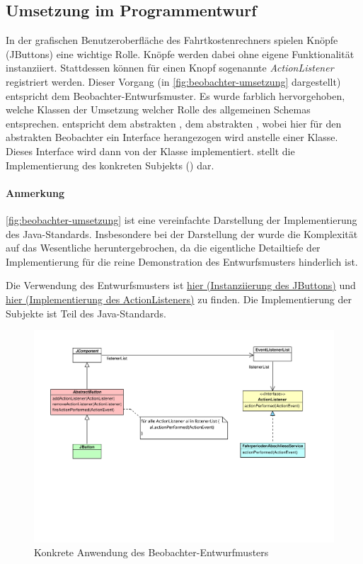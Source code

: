 \subsection{Umsetzung im Programmentwurf}
In der grafischen Benutzeroberfläche des Fahrtkostenrechners spielen Knöpfe (JButtons) eine wichtige Rolle.
Knöpfe werden dabei ohne eigene Funktionalität instanziiert.
Stattdessen können für einen Knopf sogenannte \emph{ActionListener} registriert werden.
Dieser Vorgang (in \autoref{fig:beobachter-umsetzung} dargestellt) entspricht dem Beobachter-Entwurfsmuster.
Es wurde farblich hervorgehoben, welche Klassen der Umsetzung welcher Rolle des allgemeinen Schemas entsprechen.
 entspricht dem abstrakten ,  dem abstrakten , wobei hier für den abstrakten Beobachter ein Interface herangezogen wird anstelle einer Klasse.
Dieses Interface wird dann von der Klasse  implementiert.
 stellt die Implementierung des konkreten Subjekts () dar.

\paragraph{Anmerkung}
\autoref{fig:beobachter-umsetzung} ist eine vereinfachte Darstellung der Implementierung des Java-Standards.
Insbesondere bei der Darstellung der  wurde die Komplexität auf das Wesentliche heruntergebrochen, da die eigentliche Detailtiefe der Implementierung für die reine Demonstration des Entwurfsmusters hinderlich ist.

Die Verwendung des Entwurfsmusters ist \href{https://github.com/yschiebelhut/carpool-java/blob/master/0-carpool-java-plugin-ui/src/main/java/gui/FahrperiodeGUI.java#L103}{hier (Instanziierung des JButtons)} und \href{https://github.com/yschiebelhut/carpool-java/blob/master/2-carpool-java-application/src/main/java/services/FahrperiodenAbschliessService.java}{hier (Implementierung des ActionListeners)} zu finden.
Die Implementierung der Subjekte ist Teil des Java-Standards.

\begin{figure}
    \centering
    \includegraphics[width=\textwidth, trim = 0cm 7cm 0cm 0cm]{../VPP/Beobachter-Umsetzung.pdf}
    \caption{Konkrete Anwendung des Beobachter-Entwurfmusters}
    \label{fig:beobachter-umsetzung}
\end{figure}